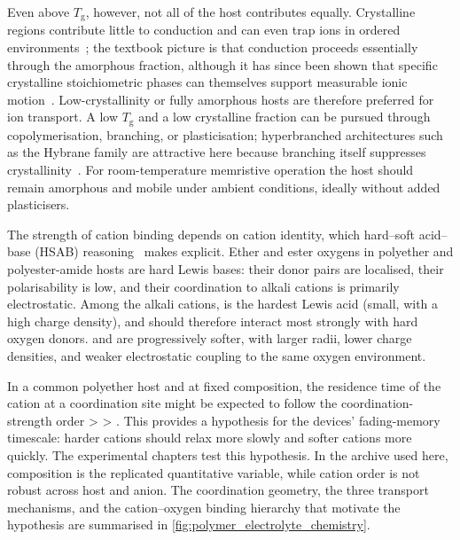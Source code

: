 \documentclass[12pt, twoside]{report}
\begin{document}
Even above \(T_{\mathrm{g}}\), however, not all of the host contributes equally. Crystalline regions contribute little to conduction and can even trap ions in ordered environments~\cite{Lightfoot1993, RatnerShriver1988}; the textbook picture is that conduction proceeds essentially through the amorphous fraction, although it has since been shown that specific crystalline stoichiometric phases can themselves support measurable ionic motion~\cite{Gadjourova2001}. Low-crystallinity or fully amorphous hosts are therefore preferred for ion transport. A low \(T_{\mathrm{g}}\) and a low crystalline fraction can be pursued through copolymerisation, branching, or plasticisation; hyperbranched architectures such as the Hybrane family are attractive here because branching itself suppresses crystallinity~\cite{VoitLederer2009}. For room-temperature memristive operation the host should remain amorphous and mobile under ambient conditions, ideally without added plasticisers.

The strength of cation binding depends on cation identity, which hard--soft acid--base (HSAB) reasoning~\cite{Pearson1963} makes explicit. Ether and ester oxygens in polyether and polyester-amide hosts are hard Lewis bases: their donor pairs are localised, their polarisability is low, and their coordination to alkali cations is primarily electrostatic. Among the alkali cations,  is the hardest Lewis acid (small, with a high charge density), and should therefore interact most strongly with hard oxygen donors.  and  are progressively softer, with larger radii, lower charge densities, and weaker electrostatic coupling to the same oxygen environment.

In a common polyether host and at fixed composition, the residence time of the cation at a coordination site might be expected to follow the coordination-strength order  >  > . This provides a hypothesis for the devices' fading-memory timescale: harder cations should relax more slowly and softer cations more quickly. The experimental chapters test this hypothesis. In the archive used here, composition is the replicated quantitative variable, while cation order is not robust across host and anion. The coordination geometry, the three transport mechanisms, and the cation--oxygen binding hierarchy that motivate the hypothesis are summarised in \cref{fig:polymer_electrolyte_chemistry}.
\end{document}
